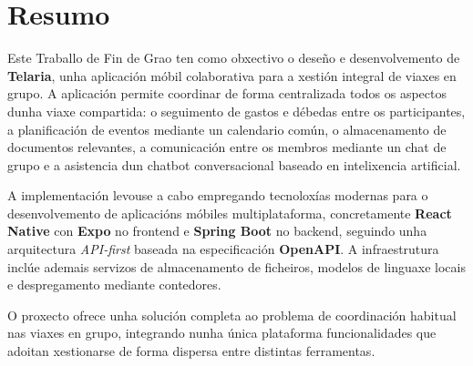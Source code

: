 \chapter*{Resumo}

Este Traballo de Fin de Grao ten como obxectivo o deseño e desenvolvemento de
\textbf{Telaria}, unha aplicación móbil colaborativa para a xestión integral de
viaxes en grupo. A aplicación permite coordinar de forma centralizada todos os
aspectos dunha viaxe compartida: o seguimento de gastos e débedas entre os
participantes, a planificación de eventos mediante un calendario común, o
almacenamento de documentos relevantes, a comunicación entre os membros mediante
un chat de grupo e a asistencia dun chatbot conversacional baseado en intelixencia
artificial.

A implementación levouse a cabo empregando tecnoloxías modernas para o
desenvolvemento de aplicacións móbiles multiplataforma, concretamente
\textbf{React Native} con \textbf{Expo} no frontend e \textbf{Spring Boot}
no backend, seguindo unha arquitectura \textit{API-first} baseada na
especificación \textbf{OpenAPI}. A infraestrutura inclúe ademais servizos
de almacenamento de ficheiros, modelos de linguaxe locais e despregamento mediante contedores.

O proxecto ofrece unha solución completa ao problema de
coordinación habitual nas viaxes en grupo, integrando nunha única plataforma
funcionalidades que adoitan xestionarse de forma dispersa entre distintas
ferramentas.
